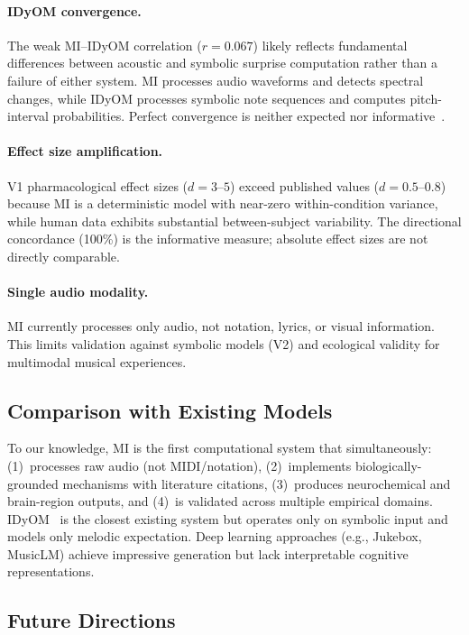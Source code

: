 \documentclass[twocolumn,10pt]{article}
\begin{document}
\paragraph{IDyOM convergence.} The weak MI--IDyOM correlation ($r = 0.067$) likely reflects fundamental differences between acoustic and symbolic surprise computation rather than a failure of either system. MI processes audio waveforms and detects spectral changes, while IDyOM processes symbolic note sequences and computes pitch-interval probabilities. Perfect convergence is neither expected nor informative~\citep{hansen2014}.

\paragraph{Effect size amplification.} V1 pharmacological effect sizes ($d = 3$--$5$) exceed published values ($d = 0.5$--$0.8$) because MI is a deterministic model with near-zero within-condition variance, while human data exhibits substantial between-subject variability. The directional concordance (100\%) is the informative measure; absolute effect sizes are not directly comparable.

\paragraph{Single audio modality.} MI currently processes only audio, not notation, lyrics, or visual information. This limits validation against symbolic models (V2) and ecological validity for multimodal musical experiences.

\subsection{Comparison with Existing Models}

To our knowledge, MI is the first computational system that simultaneously: (1)~processes raw audio (not MIDI/notation), (2)~implements biologically-grounded mechanisms with literature citations, (3)~produces neurochemical and brain-region outputs, and (4)~is validated across multiple empirical domains. IDyOM~\citep{pearce2018} is the closest existing system but operates only on symbolic input and models only melodic expectation. Deep learning approaches (e.g., Jukebox, MusicLM) achieve impressive generation but lack interpretable cognitive representations.

\subsection{Future Directions}
\end{document}
